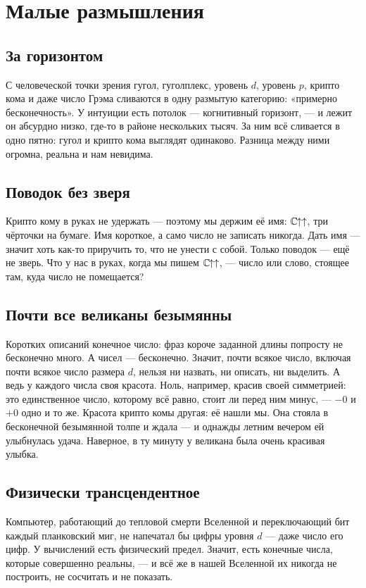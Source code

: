 \section{Малые размышления}

\subsection{За горизонтом}
С человеческой точки зрения гугол, гуголплекс, уровень \(d\), уровень \(p\), крипто кома и
даже число Грэма сливаются в одну размытую категорию: «примерно бесконечность». У интуиции
есть потолок --- когнитивный горизонт, --- и лежит он абсурдно низко, где-то в районе
нескольких тысяч. За ним всё сливается в одно пятно: гугол и крипто кома выглядят одинаково. Разница между ними огромна, реальна и
нам невидима.

\subsection{Поводок без зверя}
Крипто кому в руках не удержать --- поэтому мы держим её имя: \(\mathbb{C}\mkern-1.5mu{\uparrow\uparrow}\), три чёрточки на
бумаге. Имя короткое, а само число не записать никогда. Дать имя --- значит хоть как-то
приручить то, что не унести с собой. Только поводок --- ещё не зверь. Что у нас в руках, когда мы пишем \(\mathbb{C}\mkern-1.5mu{\uparrow\uparrow}\), --- число или слово, стоящее
там, куда число не помещается?

\subsection{Почти все великаны безымянны}
Коротких описаний конечное число: фраз короче заданной длины попросту не бесконечно много.
А чисел --- бесконечно. Значит, почти всякое число, включая почти всякое число размера
\(d\), нельзя ни назвать, ни описать, ни выделить. А ведь у каждого числа своя красота.
Ноль, например, красив своей симметрией: это единственное число, которому всё равно, стоит
ли перед ним минус, --- \(-0\) и \(+0\) одно и то же. Красота крипто комы другая: её нашли
мы. Она стояла в бесконечной безымянной толпе и ждала --- и однажды летним вечером ей
улыбнулась удача. Наверное, в ту минуту у великана была очень красивая улыбка.

\subsection{Физически трансцендентное}
Компьютер, работающий до тепловой смерти Вселенной и переключающий бит каждый планковский
миг, не напечатал бы цифры уровня \(d\) --- даже число его цифр. У вычислений есть физический
предел. Значит, есть конечные числа, которые совершенно реальны, --- и всё же в нашей Вселенной
их никогда не построить, не сосчитать и не показать.

